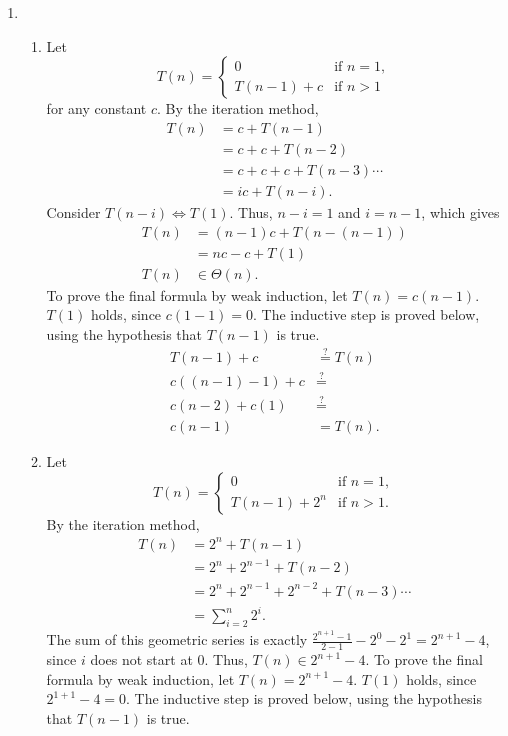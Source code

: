 \documentclass[12pt]{article}
\newcommand{\posseq}{\stackrel{?}{=}}
\begin{document}
\begin{enumerate}
  \item
  \begin{enumerate}
    \item Let \[
      T(n) = \begin{cases}
        0 &\text{if } n = 1, \\
        T(n - 1) + c &\text{if } n > 1
      \end{cases}
    \] for any constant $c$. By the iteration method,
    \begin{align*}
      T(n) &= c + T(n - 1) \\
      &= c + c + T(n - 2) \\
      &= c + c + c + T(n - 3) \cdots \\
      &= ic + T(n - i).
    \end{align*}
    Consider $T(n - i) \Leftrightarrow T(1)$. Thus, $n - i = 1$ and $i = n - 1$, which gives
    \begin{align*}
      T(n) &= (n - 1)c + T(n - (n - 1)) \\
      &= nc - c + T(1) \\
      T(n) &\in \Theta(n).
    \end{align*}
    To prove the final formula by weak induction, let $T(n) = c(n - 1)$. $T(1)$ holds, since $c(1 - 1) = 0$. The inductive step is proved below, using the hypothesis that $T(n - 1)$ is true.
    \begin{align*}
      T(n - 1) + c &\posseq T(n) \\
      c((n - 1) - 1) + c &\posseq \\
      c(n - 2) + c(1) &\posseq \\
      c(n - 1) &= T(n).
    \end{align*}
    \item Let \[
      T(n) = \begin{cases}
        0 &\text{if } n = 1, \\
        T(n - 1) + 2^{n} &\text{if } n > 1.
      \end{cases}
    \] By the iteration method,
    \begin{align*}
      T(n) &= 2^{n} + T(n - 1) \\
      &= 2^{n} + 2^{n - 1} + T(n - 2) \\
      &= 2^{n} + 2^{n - 1} + 2^{n - 2} + T(n - 3) \cdots \\
      &= \sum_{i = 2}^{n} 2^{i}.
    \end{align*}
    The sum of this geometric series is exactly $\frac{2^{n + 1} - 1}{2 - 1} - 2^{0} - 2^{1} = 2^{n + 1} - 4$, since $i$ does not start at $0$. Thus, $T(n) \in 2^{n + 1} - 4$. To prove the final formula by weak induction, let $T(n) = 2^{n + 1} - 4$. $T(1)$ holds, since $2^{1 + 1} - 4 = 0$. The inductive step is proved below, using the hypothesis that $T(n - 1)$ is true.

\end{enumerate}
\end{enumerate}
\end{document}
